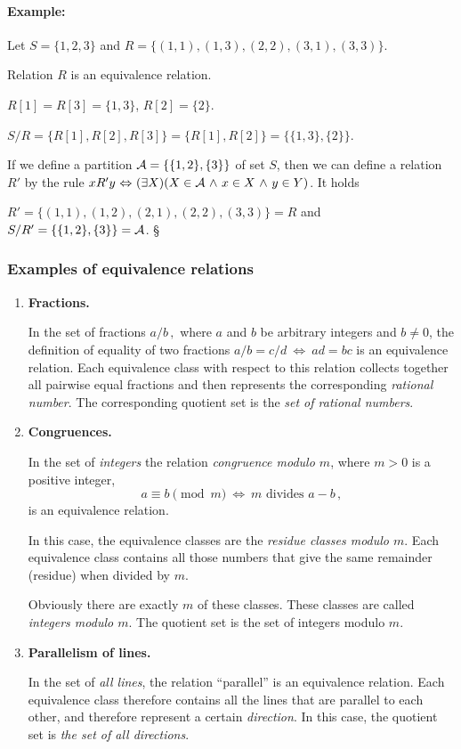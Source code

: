 \documentclass[11pt,paper=b5,footinclude,headinclude]{scrbook} %
\def\inn {{~\wedge~}}
\def\cee {{~\Leftrightarrow~}}
\def\zgled{\paragraph{Example:}}
\def\kz{{\hfill{\S}}}%
\theoremstyle{remark}
\theoremstyle{definition} %
\theoremstyle{theorem} %
\begin{document}
\bigskip
\zgled

Let $S = \{1,2,3\}$ and $R = \{(1,1),(1,3),(2,2),(3,1),(3,3)\}$.

Relation  $R$ is an equivalence relation.

$R[1] = R[3] = \{1,3\}$, $R[2] = \{2\}$.

$S/R =  \{R[1], R[2],R[3]\} = \{R[1], R[2]\} = \{\{1,3\},\{2\}\}$.

If we define a partition ${\cal A} = \{\{1,2\},\{3\}\}$ of set $S$, then we can define a relation $R'$ by the rule
$xR'y \cee (\exists X)(X\in {\cal A}\inn x\in X\inn y\in Y)$.
It holds

$R' = \{(1,1),(1,2),(2,1),(2,2),(3,3)\} = R$
and $S/R' = \{\{1,2\},\{3\}\} = {\cal A}$.
\kz


\subsubsection{Examples of equivalence relations}

\begin{enumerate}
\item \textbf{ Fractions.}

In the set of fractions $a/b\,,$
   where $ a $ and $ b $ be arbitrary integers and $ b \neq 0$, the definition of equality of two fractions
   $a / b = c / d \cee ad = bc$
    is an equivalence relation. Each equivalence class with respect to this relation collects together all pairwise equal fractions and then represents the corresponding {\em rational number}. The corresponding quotient set is the {\em set of rational numbers}.
   \item \textbf{ Congruences.}


   In the set of {\em integers} the relation {\em congruence modulo $m$}, where $ m> 0$  is a positive integer, $$a \equiv b \pmod{m} \cee m \textrm{ divides } a-b \,,$$
   is an equivalence relation.

   In this case, the equivalence classes are the {\em residue classes modulo $ m $}. Each equivalence class contains all those numbers that give the same remainder (residue) when divided by $ m $.

   Obviously there are exactly $ m $ of these classes. These classes are called {\em integers modulo $ m $}. The quotient set is the set of integers modulo $m$.

   \item \textbf{ Parallelism of lines.}

In the set of {\em all lines}, the relation ``parallel'' is an equivalence relation. Each equivalence class therefore contains all the lines that are parallel to each other, and therefore represent a certain {\em direction}. In this case, the quotient set is {\em the set of all directions}.
\end{enumerate}
\end{document}
